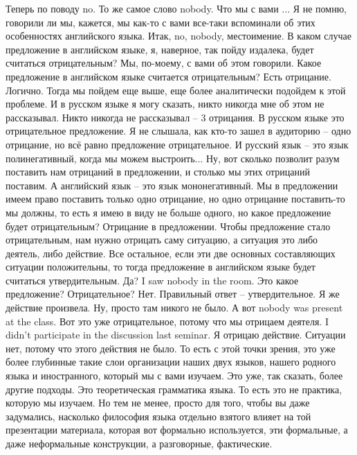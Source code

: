 \documentclass[main.tex]{subfiles}
\begin{document}
Теперь по поводу no.
То же самое слово nobody.
Что мы с вами ...
Я не помню, говорили ли мы, кажется, мы как-то с вами все-таки вспоминали об этих особенностях английского языка.
Итак, no, nobody, местоимение.
В каком случае предложение в английском языке, я, наверное, так пойду издалека, будет считаться отрицательным?
Мы, по-моему, с вами об этом говорили.
Какое предложение в английском языке считается отрицательным?
Есть отрицание.
Логично.
Тогда мы пойдем еще выше, еще более аналитически подойдем к этой проблеме.
И в русском языке я могу сказать, никто никогда мне об этом не рассказывал.
Никто никогда не рассказывал -- 3 отрицания.
В русском языке это отрицательное предложение.
Я не слышала, как кто-то зашел в аудиторию -- одно отрицание, но всё равно предложение отрицательное.
И русский язык -- это язык полинегативный, когда мы можем выстроить...
Ну, вот сколько позволит разум поставить нам отрицаний в предложении, и столько мы этих отрицаний поставим.
А английский язык -- это язык мононегативный.
Мы в предложении имеем право поставить только одно отрицание, но одно отрицание поставить-то мы должны, то есть я имею в виду не больше одного, но какое предложение будет отрицательным?
Отрицание в предложении.
Чтобы предложение стало отрицательным, нам нужно отрицать саму ситуацию, а ситуация это либо деятель, либо действие.
Все остальное, если эти две основных составляющих ситуации положительны, то тогда предложение в английском языке будет считаться утвердительным.
Да?
I saw nobody in the room.
Это какое предложение?
Отрицательное?
Нет.
Правильный ответ -- утвердительное.
Я же действие произвела.
Ну, просто там никого не было.
А вот nobody was present at the class.
Вот это уже отрицательное, потому что мы отрицаем деятеля.
I didn't participate in the discussion last seminar.
Я отрицаю действие.
Ситуации нет, потому что этого действия не было.
То есть с этой точки зрения, это уже более глубинные такие слои организации наших двух языков, нашего родного языка и иностранного, который мы с вами изучаем.
Это уже, так сказать, более другие подходы.
Это теоретическая грамматика языка.
То есть это не практика, которую мы изучаем.
Но тем не менее, просто для того, чтобы вы даже задумались, насколько философия языка отдельно взятого влияет на той презентации материала, которая вот формально используется, эти формальные, а даже неформальные конструкции, а разговорные, фактические.
\end{document}
